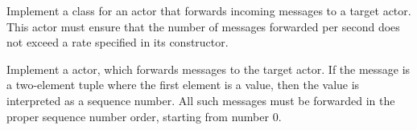 \documentclass[11pt]{article}
\begin{document}
\begin{myExercise}
Implement a  class for an actor that forwards incoming messages to a target actor. This actor must ensure that the number of messages forwarded per second does not exceed a rate specified in its constructor.
\end{myExercise}

\begin{myExercise}
Implement a  actor, which forwards messages to the target actor. If the message is a two-element tuple where the first element is a  value, then the  value is interpreted as a sequence number. All such messages must be forwarded in the proper sequence number order, starting from number 0.
\end{myExercise}

\end{document}
